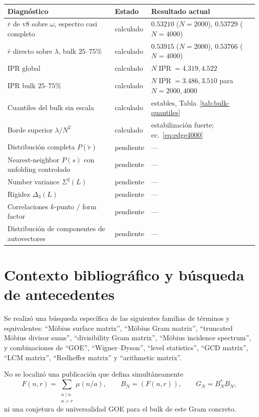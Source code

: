 \documentclass[11pt,a4paper]{article}
\newcommand{\IPR}{\operatorname{IPR}}
\begin{document}
\begin{center}
\begin{tabular}{p{}p{}p{}}
\toprule
Diagnóstico & Estado & Resultado actual\\
\midrule
$\bar r$ de v8 sobre $\omega$, espectro casi completo & calculado & $0.53210$ ($N=2000$), $0.53729$ ($N=4000$)\\
$\bar r$ directo sobre $\lambda$, bulk $25$--$75\%$ & calculado & $0.53915$ ($N=2000$), $0.53766$ ($N=4000$)\\
IPR global & calculado & $N\overline{\IPR}=4.319,4.522$\\
IPR bulk $25$--$75\%$ & calculado & $N\overline{\IPR}=3.486,3.510$ para $N=2000,4000$\\
Cuantiles del bulk sin escala & calculado & estables, Tabla~\ref{tab:bulk-quantiles}\\
Borde superior $\lambda/N^2$ & calculado & estabilización fuerte; ec.~\eqref{eq:edge4000}\\
Distribución completa $P(\widetilde r)$ & pendiente & ---\\
Nearest-neighbor $P(s)$ con unfolding controlado & pendiente & ---\\
Number variance $\Sigma^2(L)$ & pendiente & ---\\
Rigidez $\Delta_3(L)$ & pendiente & ---\\
Correlaciones $k$-punto / form factor & pendiente & ---\\
Distribución de componentes de autovectores & pendiente & ---\\
\bottomrule
\end{tabular}
\end{center}

\section{Contexto bibliográfico y búsqueda de antecedentes}

Se realizó una búsqueda específica de las siguientes familias de términos y equivalentes: ``Möbius surface matrix'', ``Möbius Gram matrix'', ``truncated Möbius divisor sums'', ``divisibility Gram matrix'', ``Möbius incidence spectrum'', y combinaciones de ``GOE'', ``Wigner--Dyson'', ``level statistics'', ``GCD matrix'', ``LCM matrix'', ``Redheffer matrix'' y ``arithmetic matrix''.

No se localizó una publicación que defina simultáneamente
\begin{equation}
F(n,r)=\sum_{\substack{a\mid n\\a>r}}\mu(n/a),
\qquad
B_N=(F(n,r)),
\qquad
G_N=B_N^*B_N,
\end{equation}
ni una conjetura de universalidad GOE para el bulk de este Gram concreto.
\end{document}
